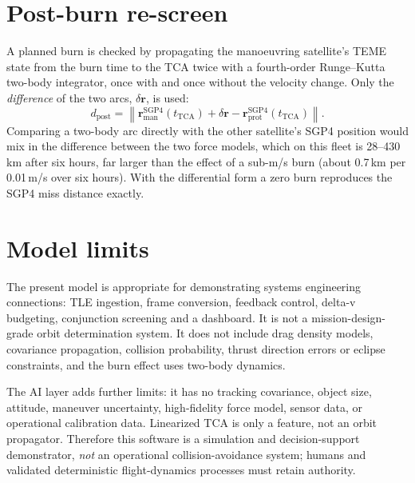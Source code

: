 \documentclass[11pt,a4paper]{article}
\begin{document}
\section{Post-burn re-screen}
A planned burn is checked by propagating the manoeuvring satellite's TEME state from the burn time to the TCA twice with a fourth-order Runge--Kutta two-body integrator, once with and once without the velocity change. Only the \emph{difference} of the two arcs, $\delta\mathbf r$, is used:
\begin{equation}
  d_{\mathrm{post}}=\left\|\mathbf r^{\mathrm{SGP4}}_{\mathrm{man}}(t_{\mathrm{TCA}})+\delta\mathbf r-\mathbf r^{\mathrm{SGP4}}_{\mathrm{prot}}(t_{\mathrm{TCA}})\right\|.
\end{equation}
Comparing a two-body arc directly with the other satellite's SGP4 position would mix in the difference between the two force models, which on this fleet is 28--430\,km after six hours, far larger than the effect of a sub-m/s burn (about 0.7\,km per 0.01\,m/s over six hours). With the differential form a zero burn reproduces the SGP4 miss distance exactly.

\section{Model limits}
The present model is appropriate for demonstrating systems engineering connections: TLE ingestion, frame conversion, feedback control, delta-v budgeting, conjunction screening and a dashboard. It is not a mission-design-grade orbit determination system. It does not include drag density models, covariance propagation, collision probability, thrust direction errors or eclipse constraints, and the burn effect uses two-body dynamics.

The AI layer adds further limits: it has no tracking covariance, object size, attitude, maneuver uncertainty, high-fidelity force model, sensor data, or operational calibration data. Linearized TCA is only a feature, not an orbit propagator. Therefore this software is a simulation and decision-support demonstrator, \emph{not} an operational collision-avoidance system; humans and validated deterministic flight-dynamics processes must retain authority.
\end{document}
